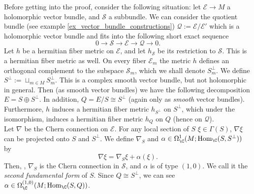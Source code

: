 Before getting into the proof, consider the following situation: let \(\mathcal{E}\to M\) a holomorphic vector bundle, and \(\mathcal{S}\) a subbundle. We can consider the quotient bundle (see example \ref{ex_vector_bundle_constructions}) \(\mathcal{Q}:=\mathcal{E}/\mathcal{E}'\) which is a holomorphic vector bundle and fits into the following short exact sequence
\begin{equation} \label{eq_short_exact_seq}
0 \to \mathcal{S} \to \mathcal{E} \to \mathcal{Q} \to 0.
\end{equation}
Let \(h\) be a hermitian fiber metric on \(\mathcal{E}\), and let \(h_{\mathcal{S}}\) be its restriction to \(\mathcal{S}\). This is a hermitian fiber metric as well. On every fiber \(\mathcal{E}_m\) the metric \(h\) defines an orthogonal complement to the subspace \(\mathcal{S}_m\), which we shall denote \(S_m^\perp\). We define \(S^\perp:=\sqcup_{m \in M} S_m^\perp\). This is a complex smooth vector bundle, but not holomorphic in general. Then (as smooth vector bundles) we have the following decomposition \(E=S\oplus S^\perp\). In addition, \(Q=E/S\cong S^\perp\) (again only as \textit{smooth} vector bundles). Furthermore, \(h\) induces a hermitian fiber metric \(h_{S^\perp}\) on \(S^\perp\), which under the isomorphism, induces a hermitian fiber metric \(h_Q\) on \(Q\) (hence on \(\mathcal{Q}\)). \\

Let \(\nabla\) be the Chern connection on \(\mathcal{E}\). For any local section of \(S\) \(\xi\in \Gamma(S)\), \(\nabla\xi\) can be projected onto \(S\) and \(S^\perp\). We define \(\nabla_S\) and \(\alpha\in \Omega_\C^1(M;\mathrm{Hom}_\C(S, S^\perp))\) by
\[
\nabla \xi = \nabla_S \xi + \alpha(\xi).
\] 
Then, \parencite[Prop. 1.6.4]{kobayashi_complex_vector_bundles}, \(\nabla_S\) is the Chern connection in \(\mathcal{S}\), and \(\alpha\) is of type \((1,0)\). We call it the \textit{second fundamental form} of \(S\). Since \(Q \cong S^\perp\), we can see \(\alpha \in \Omega_{\C}^{(1,0)}(M;\mathrm{Hom}_{\C}(S, Q))\). \\

